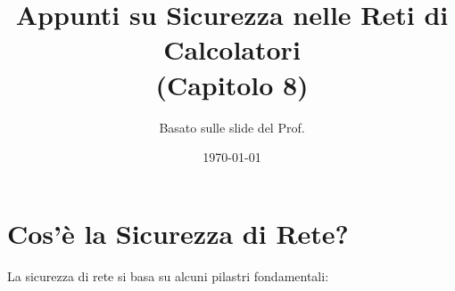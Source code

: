 

\title{Appunti su Sicurezza nelle Reti di Calcolatori \\ (Capitolo 8)}
\author{Basato sulle slide del Prof.} %
\date{\today}


\maketitle
\tableofcontents
\newpage

\section{Cos'è la Sicurezza di Rete?}
\label{sec:cos_e_sicurezza}

La sicurezza di rete si basa su alcuni pilastri fondamentali:


